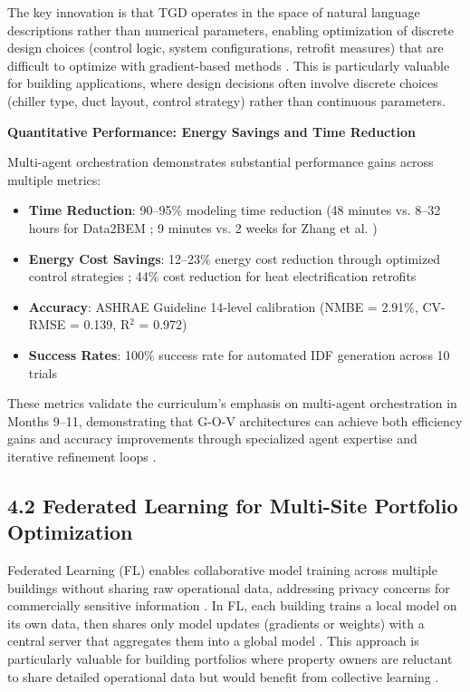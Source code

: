 \documentclass[12pt,a4paper]{article}
\begin{document}
The key innovation is that TGD operates in the space of natural language descriptions rather than numerical parameters, enabling optimization of discrete design choices (control logic, system configurations, retrofit measures) that are difficult to optimize with gradient-based methods \cite{ref145}. This is particularly valuable for building applications, where design decisions often involve discrete choices (chiller type, duct layout, control strategy) rather than continuous parameters.

\textbf{Quantitative Performance: Energy Savings and Time Reduction}

Multi-agent orchestration demonstrates substantial performance gains across multiple metrics:

\begin{itemize}
  \item \textbf{Time Reduction}: 90--95\% modeling time reduction (48 minutes vs. 8--32 hours for Data2BEM \cite{ref146}; 9 minutes vs. 2 weeks for Zhang et al. \cite{ref147})
  \item \textbf{Energy Cost Savings}: 12--23\% energy cost reduction through optimized control strategies \cite{ref148}; 44\% cost reduction for heat electrification retrofits \cite{ref149}
  \item \textbf{Accuracy}: ASHRAE Guideline 14-level calibration (NMBE = 2.91\%, CV-RMSE = 0.139, R$^2$ = 0.972) \cite{ref150}
  \item \textbf{Success Rates}: 100\% success rate for automated IDF generation across 10 trials \cite{ref151}
\end{itemize}

These metrics validate the curriculum's emphasis on multi-agent orchestration in Months 9--11, demonstrating that G-O-V architectures can achieve both efficiency gains and accuracy improvements through specialized agent expertise and iterative refinement loops \cite{ref152}.

\subsection{4.2 Federated Learning for Multi-Site Portfolio Optimization}

Federated Learning (FL) enables collaborative model training across multiple buildings without sharing raw operational data, addressing privacy concerns for commercially sensitive information \cite{ref153}. In FL, each building trains a local model on its own data, then shares only model updates (gradients or weights) with a central server that aggregates them into a global model \cite{ref154}. This approach is particularly valuable for building portfolios where property owners are reluctant to share detailed operational data but would benefit from collective learning \cite{ref155}.
\end{document}

